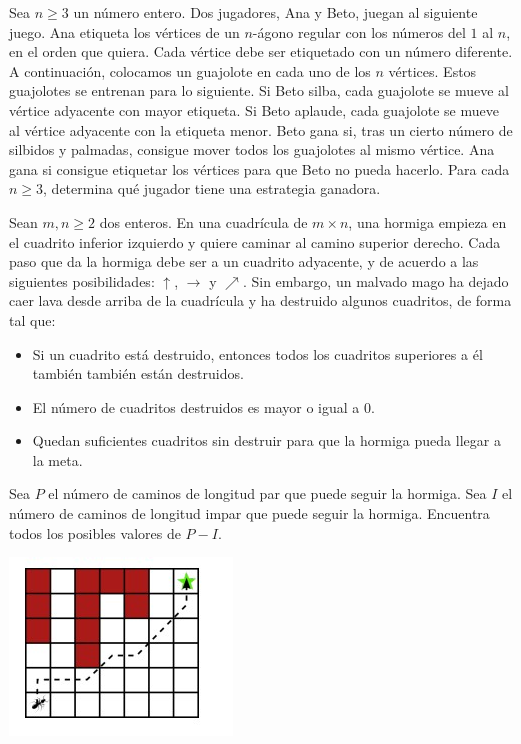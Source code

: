\documentclass[11pt]{scrartcl}
\begin{document}
\begin{problem}
    [2020/3] 
    Sea $n\ge 3$ un número entero. Dos jugadores, Ana y Beto, juegan al siguiente juego. Ana etiqueta los vértices de un $n$-ágono regular con los números del $1$ al $n$, en el orden que quiera. Cada vértice debe ser etiquetado con un número diferente. A continuación, colocamos un guajolote en cada uno de los $n$ vértices.  \newline 
Estos guajolotes se entrenan para lo siguiente. Si Beto silba, cada guajolote se mueve al vértice adyacente con mayor etiqueta. Si Beto aplaude, cada guajolote se mueve al vértice adyacente con la etiqueta menor.  \newline 
Beto gana si, tras un cierto número de silbidos y palmadas, consigue mover todos los guajolotes al mismo vértice. Ana gana si consigue etiquetar los vértices para que Beto no pueda hacerlo. Para cada $n\ge 3$, determina qué jugador tiene una estrategia ganadora.
\end{problem}
\begin{problem}
    [2021/3] 
    Sean $m,n\geq 2$ dos enteros. En una cuadrícula de $m\times n$, una hormiga empieza en el cuadrito inferior izquierdo y quiere caminar al camino superior derecho. Cada paso que da la hormiga debe ser a un cuadrito adyacente, y de acuerdo a las siguientes posibilidades: $\uparrow$, $\rightarrow$ y $\nearrow$. Sin embargo, un malvado mago ha dejado caer lava desde arriba de la cuadrícula y ha destruido algunos cuadritos, de forma tal que:
 \begin{itemize} 
 \item Si un cuadrito está destruido, entonces todos los cuadritos superiores a él también también están destruidos.

 \item El número de cuadritos destruidos es mayor o igual a $0$.

 \item Quedan suficientes cuadritos sin destruir para que la hormiga pueda llegar a la meta. 
 \end{itemize} 
Sea $P$ el número de caminos de longitud par que puede seguir la hormiga. Sea $I$ el número de caminos de longitud impar que puede seguir la hormiga. Encuentra todos los posibles valores de $P-I$.
    \begin{center}
        \includegraphics[scale=0.6]{21OMM3.jpg}
    \end{center}
\end{problem}
\end{document}
